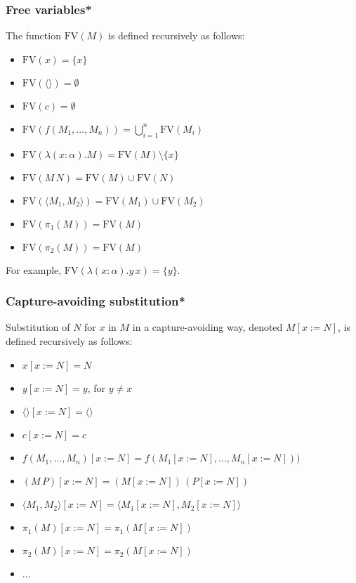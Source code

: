 \documentclass[aspectratio=169]{beamer}
\begin{document}
\begin{frame}
\frametitle{Free variables*}
The function $\text{FV}(M)$ is defined recursively as follows:
\begin{itemize}
    \item $\text{FV}(x) = \{x\}$
    \item $\text{FV}(\langle \rangle) = \emptyset$
    \item $\text{FV}(c) = \emptyset$
    \item $\text{FV}(f(M_1, \ldots, M_n)) = \bigcup_{i=1}^{n} \text{FV}(M_i)$
    \pause
    \item $\text{FV}(\lambda (x: \alpha). M) = \text{FV}(M) \setminus \{x\}$
    \pause
    \item $\text{FV}(M \, N) = \text{FV}(M) \cup \text{FV}(N)$
    \item $\text{FV}(\langle M_1, M_2 \rangle) = \text{FV}(M_1) \cup \text{FV}(M_2)$
    \item $\text{FV}(\pi_1(M)) = \text{FV}(M)$
    \item $\text{FV}(\pi_2(M)) = \text{FV}(M)$
\end{itemize}

\pause
For example, $\text{FV}(\lambda (x: \alpha). y \, x) = \{y\}$.

\end{frame}

\begin{frame}
\frametitle{Capture-avoiding substitution*}

Substitution of $N$ for $x$ in $M$ in a capture-avoiding way, denoted $M[x := N]$, is defined recursively as follows:

\begin{itemize}
    \item $x[x := N] = N$
    \item $y[x := N] = y$, for $y \neq x$
    \pause
    \item $\langle \rangle[x := N] = \langle \rangle$
    \item $c[x := N] = c$
    \pause
    \item $f(M_1, \ldots, M_n)[x := N] = f(M_1[x := N], \ldots, M_n[x := N]))$
    \item $(M \, P)[x := N] = (M[x := N]) \, (P[x := N])$
    \item $\langle M_1 , M_2 \rangle[x := N] = \langle M_1[x := N], M_2[x := N] \rangle$
    \item $\pi_1(M)[x := N] = \pi_1(M[x := N])$
    \item $\pi_2(M)[x := N] = \pi_2(M[x := N])$
    \item $\ldots$
\end{itemize}
\end{frame}
\end{document}
